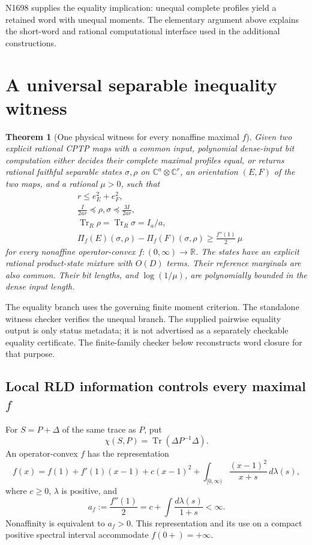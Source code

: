 \documentclass[11pt,a4paper]{article}
\newtheorem{theorem}{Theorem}[section]
\theoremstyle{definition}\newtheorem{definition}[theorem]{Definition}
\newcommand{\Tr}{\operatorname{Tr}}
\newcommand{\C}{\mathbb C}
\newcommand{\R}{\mathbb R}
\begin{document}
N1698 supplies the equality implication: unequal complete profiles yield a retained word with unequal moments. The elementary argument above explains the short-word and rational computational interface used in the additional constructions.

\section{A universal separable inequality witness}\label{sec:witness}

\begin{theorem}[One physical witness for every nonaffine maximal $f$]\label{thm:witness}
Given two explicit rational CPTP maps with a common input, polynomial dense-input bit computation either decides their complete maximal profiles equal, or returns rational faithful separable states $\sigma,\rho$ on $\C^a\otimes\C^r$, an orientation $(E,F)$ of the two maps, and a rational $\mu>0$, such that
\begin{align*}
 &r\le e_E^2+e_F^2,\\
 &\frac{I}{2ar}\preceq\rho,\sigma\preceq\frac{3I}{2ar},\\
 &\Tr_R\rho=\Tr_R\sigma=I_a/a,\\
 &\Pi_f(E)(\sigma,\rho)-\Pi_f(F)(\sigma,\rho)
 \ge \frac{f''(1)}2\,\mu
\end{align*}
for every nonaffine operator-convex $f:(0,\infty)\to\R$. The states have an explicit rational product-state mixture with $O(D)$ terms. Their reference marginals are also common. Their bit lengths, and $\log(1/\mu)$, are polynomially bounded in the dense input length.
\end{theorem}

The equality branch uses the governing finite moment criterion. The standalone witness checker verifies the unequal branch. The supplied pairwise equality output is only status metadata; it is not advertised as a separately checkable equality certificate. The finite-family checker below reconstructs word closure for that purpose.

\subsection{Local RLD information controls every maximal \texorpdfstring{$f$}{f}}

For $S=P+\Delta$ of the same trace as $P$, put
\[
 \chi(S,P)=\Tr(\Delta P^{-1}\Delta).
\]
An operator-convex $f$ has the representation~\cite{HiaiMosonyi}
\begin{equation}\label{eq:loewner}
 f(x)=f(1)+f'(1)(x-1)+c(x-1)^2
   +\int_{[0,\infty)}\frac{(x-1)^2}{x+s}\,d\lambda(s),
\end{equation}
where $c\ge0$, $\lambda$ is positive, and
\[
 a_f:=\frac{f''(1)}2=c+\int\frac{d\lambda(s)}{1+s}<\infty.
\]
Nonaffinity is equivalent to $a_f>0$. This representation and its use on a compact positive spectral interval accommodate $f(0+)=+\infty$.
\end{document}
